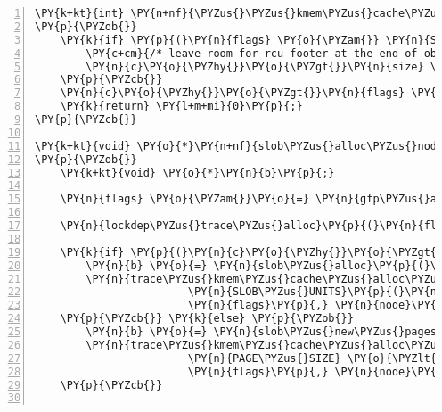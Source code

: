 \begin{Verbatim}[commandchars=\\\{\},numbers=left,firstnumber=1,stepnumber=1]
\PY{k+kt}{int} \PY{n+nf}{\PYZus{}\PYZus{}kmem\PYZus{}cache\PYZus{}create}\PY{p}{(}\PY{k}{struct} \PY{n}{kmem\PYZus{}cache} \PY{o}{*}\PY{n}{c}\PY{p}{,} \PY{k+kt}{unsigned} \PY{k+kt}{long} \PY{n}{flags}\PY{p}{)}
\PY{p}{\PYZob{}}
	\PY{k}{if} \PY{p}{(}\PY{n}{flags} \PY{o}{\PYZam{}} \PY{n}{SLAB\PYZus{}DESTROY\PYZus{}BY\PYZus{}RCU}\PY{p}{)} \PY{p}{\PYZob{}}
		\PY{c+cm}{/* leave room for rcu footer at the end of object */}
		\PY{n}{c}\PY{o}{\PYZhy{}}\PY{o}{\PYZgt{}}\PY{n}{size} \PY{o}{+}\PY{o}{=} \PY{k}{sizeof}\PY{p}{(}\PY{k}{struct} \PY{n}{slob\PYZus{}rcu}\PY{p}{)}\PY{p}{;}
	\PY{p}{\PYZcb{}}
	\PY{n}{c}\PY{o}{\PYZhy{}}\PY{o}{\PYZgt{}}\PY{n}{flags} \PY{o}{=} \PY{n}{flags}\PY{p}{;}
	\PY{k}{return} \PY{l+m+mi}{0}\PY{p}{;}
\PY{p}{\PYZcb{}}

\PY{k+kt}{void} \PY{o}{*}\PY{n+nf}{slob\PYZus{}alloc\PYZus{}node}\PY{p}{(}\PY{k}{struct} \PY{n}{kmem\PYZus{}cache} \PY{o}{*}\PY{n}{c}\PY{p}{,} \PY{k+kt}{gfp\PYZus{}t} \PY{n}{flags}\PY{p}{,} \PY{k+kt}{int} \PY{n}{node}\PY{p}{)}
\PY{p}{\PYZob{}}
	\PY{k+kt}{void} \PY{o}{*}\PY{n}{b}\PY{p}{;}

	\PY{n}{flags} \PY{o}{\PYZam{}}\PY{o}{=} \PY{n}{gfp\PYZus{}allowed\PYZus{}mask}\PY{p}{;}

	\PY{n}{lockdep\PYZus{}trace\PYZus{}alloc}\PY{p}{(}\PY{n}{flags}\PY{p}{)}\PY{p}{;}

	\PY{k}{if} \PY{p}{(}\PY{n}{c}\PY{o}{\PYZhy{}}\PY{o}{\PYZgt{}}\PY{n}{size} \PY{o}{\PYZlt{}} \PY{n}{PAGE\PYZus{}SIZE}\PY{p}{)} \PY{p}{\PYZob{}}
		\PY{n}{b} \PY{o}{=} \PY{n}{slob\PYZus{}alloc}\PY{p}{(}\PY{n}{c}\PY{o}{\PYZhy{}}\PY{o}{\PYZgt{}}\PY{n}{size}\PY{p}{,} \PY{n}{flags}\PY{p}{,} \PY{n}{c}\PY{o}{\PYZhy{}}\PY{o}{\PYZgt{}}\PY{n}{align}\PY{p}{,} \PY{n}{node}\PY{p}{)}\PY{p}{;}
		\PY{n}{trace\PYZus{}kmem\PYZus{}cache\PYZus{}alloc\PYZus{}node}\PY{p}{(}\PY{n}{\PYZus{}RET\PYZus{}IP\PYZus{}}\PY{p}{,} \PY{n}{b}\PY{p}{,} \PY{n}{c}\PY{o}{\PYZhy{}}\PY{o}{\PYZgt{}}\PY{n}{object\PYZus{}size}\PY{p}{,}
					    \PY{n}{SLOB\PYZus{}UNITS}\PY{p}{(}\PY{n}{c}\PY{o}{\PYZhy{}}\PY{o}{\PYZgt{}}\PY{n}{size}\PY{p}{)} \PY{o}{*} \PY{n}{SLOB\PYZus{}UNIT}\PY{p}{,}
					    \PY{n}{flags}\PY{p}{,} \PY{n}{node}\PY{p}{)}\PY{p}{;}
	\PY{p}{\PYZcb{}} \PY{k}{else} \PY{p}{\PYZob{}}
		\PY{n}{b} \PY{o}{=} \PY{n}{slob\PYZus{}new\PYZus{}pages}\PY{p}{(}\PY{n}{flags}\PY{p}{,} \PY{n}{get\PYZus{}order}\PY{p}{(}\PY{n}{c}\PY{o}{\PYZhy{}}\PY{o}{\PYZgt{}}\PY{n}{size}\PY{p}{)}\PY{p}{,} \PY{n}{node}\PY{p}{)}\PY{p}{;}
		\PY{n}{trace\PYZus{}kmem\PYZus{}cache\PYZus{}alloc\PYZus{}node}\PY{p}{(}\PY{n}{\PYZus{}RET\PYZus{}IP\PYZus{}}\PY{p}{,} \PY{n}{b}\PY{p}{,} \PY{n}{c}\PY{o}{\PYZhy{}}\PY{o}{\PYZgt{}}\PY{n}{object\PYZus{}size}\PY{p}{,}
					    \PY{n}{PAGE\PYZus{}SIZE} \PY{o}{\PYZlt{}}\PY{o}{\PYZlt{}} \PY{n}{get\PYZus{}order}\PY{p}{(}\PY{n}{c}\PY{o}{\PYZhy{}}\PY{o}{\PYZgt{}}\PY{n}{size}\PY{p}{)}\PY{p}{,}
					    \PY{n}{flags}\PY{p}{,} \PY{n}{node}\PY{p}{)}\PY{p}{;}
	\PY{p}{\PYZcb{}}


\end{Verbatim}
